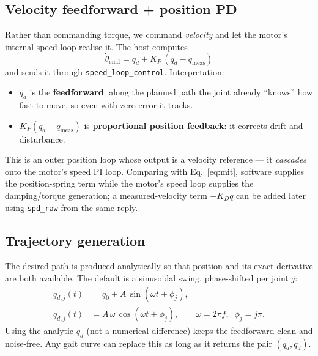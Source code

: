 \documentclass[11pt,a4paper]{article}
\newcommand{\code}[1]{\texttt{#1}}
\begin{document}
\subsection{Velocity feedforward + position PD}
Rather than commanding torque, we command \emph{velocity} and let the motor's
internal speed loop realise it. The host computes
\begin{equation}
  \boxed{\;\dot\theta_{\text{cmd}} = \dot q_d + K_P\,(q_d - q_{\text{meas}})\;}
  \label{eq:law}
\end{equation}
and sends it through \code{speed\_loop\_control}. Interpretation:
\begin{itemize}[nosep]
  \item $\dot q_d$ is the \textbf{feedforward}: along the planned path the joint
        already ``knows'' how fast to move, so even with zero error it tracks.
  \item $K_P(q_d-q_{\text{meas}})$ is \textbf{proportional position feedback}: it
        corrects drift and disturbance.
\end{itemize}
This is an outer position loop whose output is a velocity reference --- it
\emph{cascades} onto the motor's speed PI loop. Comparing with
Eq.~\eqref{eq:mit}, software supplies the position-spring term while the motor's
speed loop supplies the damping/torque generation; a measured-velocity term
$-K_D\dot q$ can be added later using \code{spd\_raw} from the same reply.

\subsection{Trajectory generation}
The desired path is produced analytically so that position and its exact
derivative are both available. The default is a sinusoidal swing, phase-shifted
per joint $j$:
\begin{align}
  q_{d,j}(t)      &= q_0 + A\,\sin(\omega t + \phi_j),\\
  \dot q_{d,j}(t) &= A\,\omega\,\cos(\omega t + \phi_j),
  \qquad \omega = 2\pi f,\;\; \phi_j = j\pi .
\end{align}
Using the analytic $\dot q_d$ (not a numerical difference) keeps the feedforward
clean and noise-free. Any gait curve can replace this as long as it returns the
pair $(q_d,\dot q_d)$.
\end{document}
